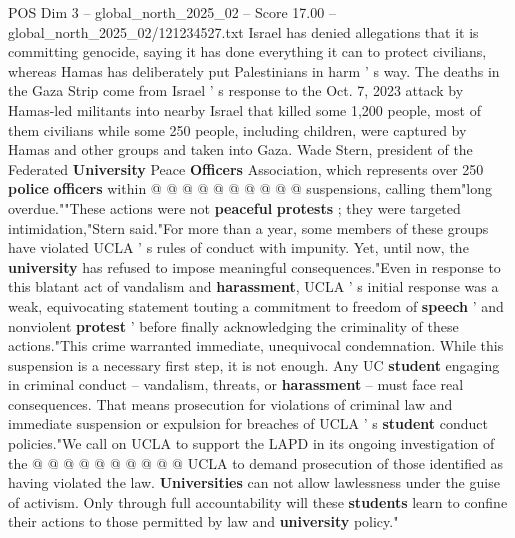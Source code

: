 \begin{textsample}{POS Dim 3 – global\_north\_2025\_02 – Score 17.00 – global\_north\_2025\_02/121234527.txt}
Israel has denied allegations that it is committing genocide, saying it has done everything it can to protect civilians, whereas Hamas has deliberately put Palestinians in harm ' s way.
The deaths in the Gaza Strip come from Israel ' s response to the Oct. 7, 2023 attack by Hamas-led militants into nearby Israel that killed some 1,200 people, most of them civilians while some 250 people, including children, were captured by Hamas and other groups and taken into Gaza.
Wade Stern, president of the Federated \textbf{University} Peace \textbf{Officers} Association, which represents over 250 \textbf{police} \textbf{officers} within @ @ @ @ @ @ @ @ @ @ suspensions, calling them"long overdue.""These actions were not \textbf{peaceful} \textbf{protests} ; they were targeted intimidation,"Stern said."For more than a year, some members of these groups have violated UCLA ' s rules of conduct with impunity.
Yet, until now, the \textbf{university} has refused to impose meaningful consequences."Even in response to this blatant act of vandalism and \textbf{harassment}, UCLA ' s initial response was a weak, equivocating statement touting a commitment to freedom of \textbf{speech} ' and nonviolent \textbf{protest} ' before finally acknowledging the criminality of these actions."This crime warranted immediate, unequivocal condemnation.
While this suspension is a necessary first step, it is not enough.
Any UC \textbf{student} engaging in criminal conduct -- vandalism, threats, or \textbf{harassment} -- must face real consequences.
That means prosecution for violations of criminal law and immediate suspension or expulsion for breaches of UCLA ' s \textbf{student} conduct policies."We call on UCLA to support the LAPD in its ongoing investigation of the @ @ @ @ @ @ @ @ @ @ UCLA to demand prosecution of those identified as having violated the law. \textbf{Universities} can not allow lawlessness under the guise of activism.
Only through full accountability will these \textbf{students} learn to confine their actions to those permitted by law and \textbf{university} policy."

\end{textsample}
